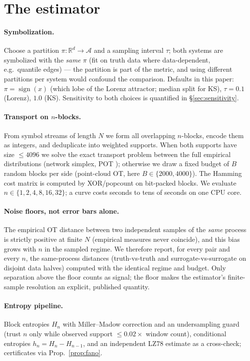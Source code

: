 \documentclass[11pt]{article}
\newcommand{\R}{\mathbb R}
\newcommand{\A}{\mathcal A}
\begin{document}
\section{The estimator}\label{sec:method}

\paragraph{Symbolization.} Choose a partition $\pi:\R^d\to\A$ and a sampling interval
$\tau$; both systems are symbolized with the \emph{same} $\pi$ (fit on truth data where
data-dependent, e.g.\ quantile edges) --- the partition is part of the metric, and using
different partitions per system would confound the comparison. Defaults in this paper:
$\pi=\operatorname{sign}(x)$ (which lobe of the Lorenz attractor; median split for KS),
$\tau=0.1$ (Lorenz), $1.0$ (KS). Sensitivity to both choices is quantified in
\S\ref{sec:sensitivity}.

\paragraph{Transport on $n$-blocks.} From symbol streams of length $N$ we form all
overlapping $n$-blocks, encode them as integers, and deduplicate into weighted supports.
When both supports have size $\le 4096$ we solve the exact transport problem between the
full empirical distributions (network simplex, POT \citep{flamary2021pot}); otherwise we
draw a fixed budget of $B$ random blocks per side (point-cloud OT, here $B\in\{2000,4000\}$).
The Hamming cost matrix is computed by XOR/popcount on bit-packed blocks. We evaluate
$n\in\{1,2,4,8,16,32\}$; a curve costs seconds to tens of seconds on one CPU core.

\paragraph{Noise floors, not error bars alone.} The empirical OT distance between two
independent samples of the \emph{same} process is strictly positive at finite $N$
(empirical measures never coincide), and this bias grows with $n$ in the sampled
regime. We therefore report, for every pair and every $n$, the same-process distances
(truth-vs-truth and surrogate-vs-surrogate on disjoint data halves) computed with the
identical regime and budget. Only separation above the floor counts as signal; the
floor makes the estimator's finite-sample resolution an explicit, published quantity.

\paragraph{Entropy pipeline.} Block entropies $H_n$ with Miller--Madow correction and
an undersampling guard (trust $n$ only while observed support $\le 0.02\times$ window
count), conditional entropies $h_n=H_n-H_{n-1}$, and an independent LZ78 estimate
\citep{ziv1978compression,lempel1976complexity} as a cross-check; certificates via
Prop.~\ref{prop:fano}.
\end{document}
